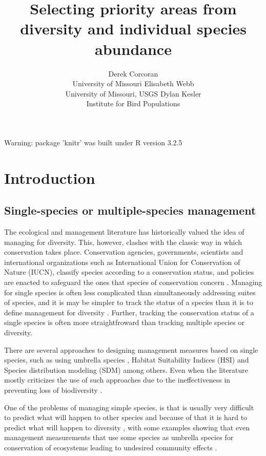 \documentclass[article]{jss}
\author{
Derek Corcoran\\University of Missouri \And Elisabeth Webb\\University of Missouri, USGS \And Dylan Kesler\\Institute for Bird Populations
}
\title{Selecting priority areas from diversity and individual species abundance
\pkg{DiversityOccupancy}}
\begin{document}
\begin{CodeChunk}
\begin{CodeOutput}
Warning: package 'knitr' was built under R version 3.2.5
\end{CodeOutput}
\end{CodeChunk}

\section{Introduction}\label{introduction}

\subsection{Single-species or multiple-species
management}\label{single-species-or-multiple-species-management}

The ecological and management literature has historically valued the
idea of managing for diversity. This, however, clashes with the classic
way in which conservation takes place. Conservation agencies,
governments, scientists and international organizations such as
International Union for Conservation of Nature (IUCN), classify species
according to a conservation status, and policies are enacted to
safeguard the ones that species of conservation concern
\citep{keller2004red, rodrigues2006value}. Managing for single species
is often less complicated than simultaneously addressing suites of
species, and it is may be simpler to track the status of a species than
it is to define management for diversity
\citep{simberloff1998flagships}. Further, tracking the conservation
status of a single species is often more straightfroward than tracking
multiple species or diversity.

There are several approaches to designing management measures based on
single species, such as using umbrella species
\citep{crosby2015looking, bichet2016maintaining}, Habitat Suitability
Indices (HSI)
\citep{reza2013integrating, soniat2013predicting, zohmann2013modelling}
and Species distribution modeling (SDM)
\citep{peterson2011ecological, guisan2013predicting} among others. Even
when the literature mostly criticizes the use of such approaches due to
the ineffectiveness in preventing loss of biodiversity
\citep{roberge2004usefulness, branton2011assessing}.

One of the problems of managing simple species, is that is usually very
difficult to predict what will happen to other species and because of
that it is hard to predict what will happen to diversity
\citep{pulliam2000relationship}, with some examples showing that even
management measurements that use some species as umbrella species for
conservation of ecosystems leading to undesired community effects
\citep{white2013conservation}.
\end{document}
